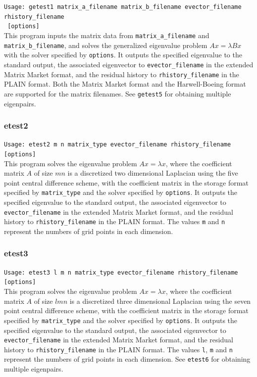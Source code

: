 \documentclass[a4paper]{article}
\begin{document}
\verb+Usage: getest1 matrix_a_filename matrix_b_filename evector_filename rhistory_filename +\\
\verb+ [options]+\\

This program inputs the matrix data from {\tt matrix\_a\_filename}
and {\tt matrix\_b\_filename}, and
solves the generalized eigenvalue problem $Ax=\lambda Bx$ with 
the solver specified by {\tt options}. 
It outputs the specified eigenvalue to the standard output, 
the associated eigenvector to {\tt evector\_filename} 
in the extended Matrix Market format, and 
the residual history to {\tt rhistory\_filename} 
in the PLAIN format.
Both the Matrix Market format and the Harwell-Boeing format are
supported for the matrix filenames. 
See {\tt getest5} for obtaining multiple eigenpairs.

\subsubsection{etest2}

\verb+Usage: etest2 m n matrix_type evector_filename rhistory_filename [options]+\\

This program solves the eigenvalue problem $Ax = \lambda x$, where the 
coefficient matrix $A$ of size $mn$ is a discretized two dimensional Laplacian using the five
point central difference scheme, with the coefficient matrix in the storage format specified
by \verb|matrix_type| and the solver specified by {\tt options}. 
It outputs the specified eigenvalue to the standard output, 
the associated eigenvector to {\tt evector\_filename} in the
extended Matrix Market format, and 
the residual history to {\tt rhistory\_filename} 
in the PLAIN format. 
The values {\tt m} and {\tt n} represent the numbers of grid points
in each dimension. 

\subsubsection{etest3}

\verb+Usage: etest3 l m n matrix_type evector_filename rhistory_filename [options]+\\

This program solves the eigenvalue problem $Ax = \lambda x$, where the 
coefficient matrix $A$ of size $lmn$ is a discretized three dimensional Laplacian using the seven
point central difference scheme, with the coefficient matrix in the storage format specified
by \verb|matrix_type| and the solver specified by {\tt options}. 
It outputs the specified eigenvalue to the standard output, 
the associated eigenvector to {\tt evector\_filename} in the
extended Matrix Market format, and
the residual history to {\tt rhistory\_filename} 
in the PLAIN format. 
The values {\tt l}, {\tt m} and {\tt n} represent the numbers of grid
points in each dimension. 
See {\tt etest6} for obtaining multiple eigenpairs.
\end{document}
